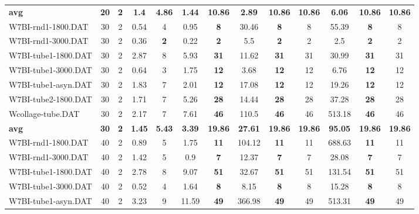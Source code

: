 \begin{table}[h]
{\begin{tabular}{lcccccccccccc}
\cline{1-13} \textbf{avg} & \textbf{20} & \textbf{2} & \textbf{1.4} & \textbf{4.86} & \textbf{1.44} & \textbf{10.86} & \textbf{2.89} & \textbf{10.86} & \textbf{10.86} & \textbf{6.06} & \textbf{10.86} & \textbf{10.86} \\ \cline{1-13}
W7BI-rnd1-1800.DAT & 30 & 2 &  \textcolor{blue2}{0.54} & 4 & 0.95 &  \textbf{8} & 30.46 &  \textbf{8} & 8 & 55.39 &  \textbf{8} & 8 \\
W7BI-rnd1-3000.DAT & 30 & 2 & 0.36 &  \textbf{2} &  \textcolor{blue2}{0.22} &  \textbf{2} & 5.5 &  \textbf{2} & 2 & 2.5 &  \textbf{2} & 2 \\
W7BI-tube1-1800.DAT & 30 & 2 &  \textcolor{blue2}{2.87} & 8 & 5.93 &  \textbf{31} & 11.62 &  \textbf{31} & 31 & 30.99 &  \textbf{31} & 31 \\
W7BI-tube1-3000.DAT & 30 & 2 &  \textcolor{blue2}{0.64} & 3 & 1.75 &  \textbf{12} & 3.68 &  \textbf{12} & 12 & 6.76 &  \textbf{12} & 12 \\
W7BI-tube1-asyn.DAT & 30 & 2 &  \textcolor{blue2}{1.83} & 7 & 2.01 &  \textbf{12} & 17.08 &  \textbf{12} & 12 & 19.26 &  \textbf{12} & 12 \\
W7BI-tube2-1800.DAT & 30 & 2 &  \textcolor{blue2}{1.71} & 7 & 5.26 &  \textbf{28} & 14.44 &  \textbf{28} & 28 & 37.28 &  \textbf{28} & 28 \\
Wcollage-tube.DAT & 30 & 2 &  \textcolor{blue2}{2.17} & 7 & 7.61 &  \textbf{46} & 110.5 &  \textbf{46} & 46 & 513.18 &  \textbf{46} & 46 \\
\cline{1-13} \textbf{avg} & \textbf{30} & \textbf{2} & \textbf{1.45} & \textbf{5.43} & \textbf{3.39} & \textbf{19.86} & \textbf{27.61} & \textbf{19.86} & \textbf{19.86} & \textbf{95.05} & \textbf{19.86} & \textbf{19.86} \\ \cline{1-13}
W7BI-rnd1-1800.DAT & 40 & 2 &  \textcolor{blue2}{0.89} & 5 & 1.75 &  \textbf{11} & 104.12 &  \textbf{11} & 11 & 688.63 &  \textbf{11} & 11 \\
W7BI-rnd1-3000.DAT & 40 & 2 & 1.42 & 5 &  \textcolor{blue2}{0.9} &  \textbf{7} & 12.37 &  \textbf{7} & 7 & 28.08 &  \textbf{7} & 7 \\
W7BI-tube1-1800.DAT & 40 & 2 &  \textcolor{blue2}{2.78} & 8 & 9.07 &  \textbf{51} & 32.67 &  \textbf{51} & 51 & 131.54 &  \textbf{51} & 51 \\
W7BI-tube1-3000.DAT & 40 & 2 &  \textcolor{blue2}{0.52} & 4 & 1.64 &  \textbf{8} & 8.15 &  \textbf{8} & 8 & 15.28 &  \textbf{8} & 8 \\
W7BI-tube1-asyn.DAT & 40 & 2 &  \textcolor{blue2}{3.23} & 9 & 11.59 &  \textbf{49} & 366.98 &  \textbf{49} & 49 & 513.31 &  \textbf{49} & 49 \\

\end{tabular}}
\end{table}
